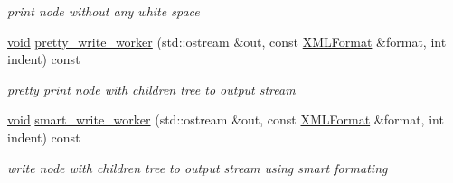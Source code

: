 \begin{DoxyCompactItemize}
\begin{DoxyCompactList}\small\item\em print node without any white space \end{DoxyCompactList}\item 
\mbox{\label{struct_x_m_l_storage_1_1_x_m_l_node_a7bc08f28e1ce86b3a92313258fa17f32}} 
\hyperlink{interfacevoid}{void} \hyperlink{struct_x_m_l_storage_1_1_x_m_l_node_a7bc08f28e1ce86b3a92313258fa17f32}{pretty\+\_\+write\+\_\+worker} (std\+::ostream \&out, const \hyperlink{struct_x_m_l_storage_1_1_x_m_l_format}{X\+M\+L\+Format} \&format, int indent) const
\begin{DoxyCompactList}\small\item\em pretty print node with children tree to output stream \end{DoxyCompactList}\item 
\mbox{\label{struct_x_m_l_storage_1_1_x_m_l_node_a6d0528d83127880eb8ed5b9c9edecf6d}} 
\hyperlink{interfacevoid}{void} \hyperlink{struct_x_m_l_storage_1_1_x_m_l_node_a6d0528d83127880eb8ed5b9c9edecf6d}{smart\+\_\+write\+\_\+worker} (std\+::ostream \&out, const \hyperlink{struct_x_m_l_storage_1_1_x_m_l_format}{X\+M\+L\+Format} \&format, int indent) const
\begin{DoxyCompactList}\small\item\em write node with children tree to output stream using smart formating \end{DoxyCompactList}\end{DoxyCompactItemize}
